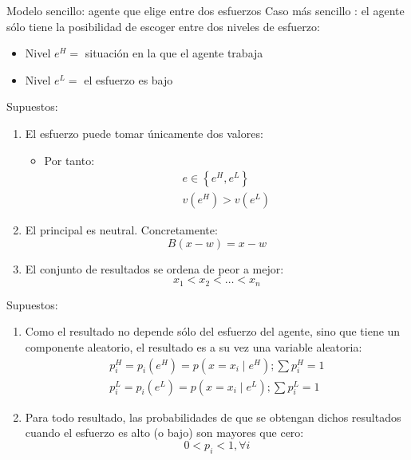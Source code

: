 \begin{frame}{Modelo sencillo: agente que elige entre dos esfuerzos}
	Caso más sencillo : el agente sólo tiene la posibilidad de escoger entre dos niveles de esfuerzo:
		\begin{itemize}
			\item Nivel $e^H =$ situación en la que el agente trabaja
			\item Nivel $e^L =$ el esfuerzo es bajo
		\end{itemize}
\end{frame}
\begin{frame}{Supuestos:}
	\begin{enumerate}
		\item El esfuerzo puede tomar únicamente dos valores:
			\begin{itemize}
				\item Por tanto:
					\begin{gather*}
						e \in \left\lbrace e^H, e^L\right\rbrace\\
						v\left( e^H\right) > v\left( e^L\right)
					\end{gather*}
			\end{itemize}
		\item El principal es neutral. Concretamente:
			$$B\left( x -w \right) = x-w$$
		\item El conjunto de resultados se ordena de peor a mejor:
			$$x_1 < x_2 < \ldots < x_n$$
	\end{enumerate}
\end{frame}
\begin{frame}{Supuestos:}
	\begin{enumerate}[4]
		\item Como el resultado no depende sólo del esfuerzo del agente, sino que tiene un componente aleatorio, el resultado es a su vez una variable aleatoria:
			\begin{gather*}
				p_{i}^{H} = p_i\left( e^H\right) = p\left( x = x_i \mid e^H\right) ; \sum p_{i}^{H} = 1\\
				p_{i}^{L} = p_i\left( e^L\right) = p\left( x = x_i \mid e^L\right) ; \sum p_{i}^{L} = 1
			\end{gather*}
		\item Para todo resultado, las probabilidades de que se obtengan dichos resultados cuando el esfuerzo es alto (o bajo) son mayores que cero:
			$$0 < p_i < 1 , \forall i$$
	\end{enumerate}
\end{frame}
